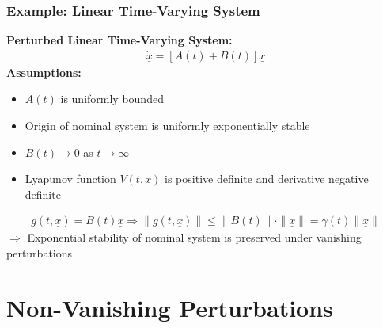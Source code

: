 \documentclass[student, noshadow, lsr, english, aspectratio=169, t]{ITR_LSR_slides}
\begin{document}
\begin{frame}
	\frametitle{Example: Linear Time-Varying System}
	\textbf{Perturbed Linear Time-Varying System:}
	\begin{align*}
		\dot{\underline{x}}=[A(t)+B(t)]\underline{x}
	\end{align*}
	\textbf{Assumptions:}
	\begin{itemize}
		\item $A(t)$ is uniformly bounded
		\item Origin of nominal system is uniformly exponentially stable
		\item $B(t) \rightarrow 0$ as $t\rightarrow\infty$
		\item Lyapunov function $V(t,\underline{x})$ is positive definite and derivative negative definite
	\end{itemize}
	\begin{align*}
		g(t,\underline{x}) = B(t)\underline{x} \Rightarrow \|g(t,\underline{x})\| \leq \|B(t)\| \cdot \|\underline{x}\| = \gamma(t) \|\underline{x}\|
	\end{align*}
	$\Rightarrow$ Exponential stability of nominal system is preserved under vanishing perturbations
	
\end{frame}

\section{Non-Vanishing Perturbations}
\end{document}
